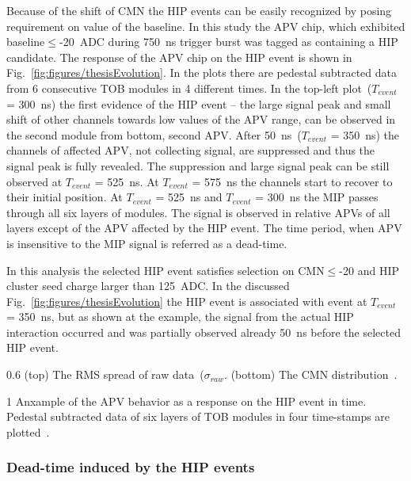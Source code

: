 Because of the shift of CMN the HIP events can be easily recognized by posing requirement on value of the baseline. In this study the APV chip, which exhibited baseline$\leq$-20~ADC during 750~ns trigger burst was tagged as containing a  HIP candidate. The response of the APV chip on the HIP event is shown in Fig.~\ref{fig:figures/thesisEvolution}. In the plots there are pedestal subtracted data from 6 consecutive TOB modules in 4 different times. In the top-left plot~($T_{event}$ = 300~ns) the first evidence of the HIP event -- the large signal peak and small shift of other channels towards low values of the APV range, can be observed in the second module from bottom, second APV. After 50~ns~($T_{event}$ = 350~ns) the channels of affected APV, not collecting signal, are suppressed and thus the signal peak is fully revealed. The suppression and large signal peak can be still observed at $T_{event}$ = 525~ns. At $T_{event}$ = 575~ns the channels start to recover to their initial position. At $T_{event}$ = 525~ns and $T_{event}$ = 300~ns the MIP passes through all six layers of modules. The signal is observed in relative APVs of all layers except of the APV affected by the HIP event. The time period, when APV is insensitive to the MIP signal is referred as a dead-time.

In this analysis the selected HIP event satisfies selection on CMN$\leq$-20 and HIP cluster seed charge larger than 125~ADC.  In the discussed Fig.~\ref{fig:figures/thesisEvolution} the HIP event is associated with event at $T_{event}$ = 350~ns, but as shown at the example, the signal from the actual HIP interaction occurred and was partially observed already 50~ns before the selected HIP event.

                 {0.6}       %
                 {(top) The RMS spread of raw data~($\sigma_{raw}$. (bottom) The CMN distribution~\cite{Bainbridge:2004jc}.} %


                 {1}       %
                 {Anxample of the APV behavior as a response on the HIP event in time. Pedestal subtracted data of six layers of TOB modules in four time-stamps are plotted~\cite{Bainbridge:2004jc}.} %



\subsubsection{Dead-time induced by the HIP events}

